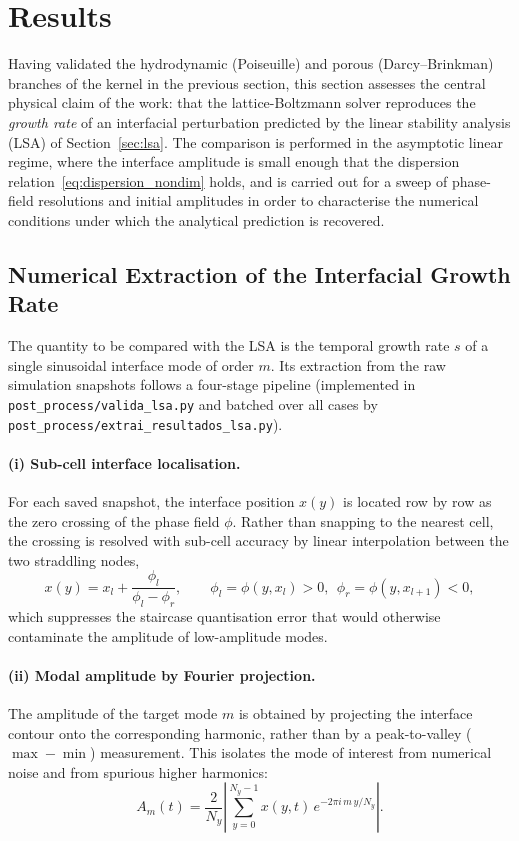 \section{Results}

Having validated the hydrodynamic (Poiseuille) and porous (Darcy--Brinkman) branches of the kernel in the previous section, this section assesses the central physical claim of the work: that the lattice-Boltzmann solver reproduces the \emph{growth rate} of an interfacial perturbation predicted by the linear stability analysis (LSA) of Section~\ref{sec:lsa}. The comparison is performed in the asymptotic linear regime, where the interface amplitude is small enough that the dispersion relation~\eqref{eq:dispersion_nondim} holds, and is carried out for a sweep of phase-field resolutions and initial amplitudes in order to characterise the numerical conditions under which the analytical prediction is recovered.

\subsection{Numerical Extraction of the Interfacial Growth Rate}
\label{sec:growth_rate_method}

The quantity to be compared with the LSA is the temporal growth rate $s$ of a single sinusoidal interface mode of order $m$. Its extraction from the raw simulation snapshots follows a four-stage pipeline (implemented in \texttt{post\_process/valida\_lsa.py} and batched over all cases by \texttt{post\_process/extrai\_resultados\_lsa.py}).

\paragraph{(i) Sub-cell interface localisation.} For each saved snapshot, the interface position $x(y)$ is located row by row as the zero crossing of the phase field $\phi$. Rather than snapping to the nearest cell, the crossing is resolved with sub-cell accuracy by linear interpolation between the two straddling nodes,
\begin{equation}
    x(y) = x_l + \frac{\phi_l}{\phi_l - \phi_r}, \qquad \phi_l = \phi(y,x_l) > 0,\ \ \phi_r = \phi(y,x_{l+1}) < 0,
\end{equation}
which suppresses the staircase quantisation error that would otherwise contaminate the amplitude of low-amplitude modes.

\paragraph{(ii) Modal amplitude by Fourier projection.} The amplitude of the target mode $m$ is obtained by projecting the interface contour onto the corresponding harmonic, rather than by a peak-to-valley ($\max-\min$) measurement. This isolates the mode of interest from numerical noise and from spurious higher harmonics:
\begin{equation}
    A_m(t) = \frac{2}{N_y}\left| \sum_{y=0}^{N_y-1} x(y,t)\,e^{-2\pi i\,m\,y/N_y} \right|.
    \label{eq:fourier_amplitude}
\end{equation}

